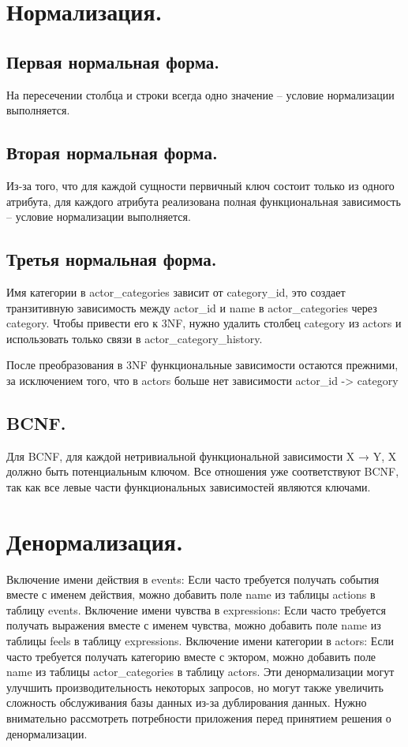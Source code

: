 \section{Нормализация.}
\subsection{Первая нормальная форма.}
На пересечении столбца и строки всегда одно значение – условие нормализации выполняется.
\subsection{Вторая нормальная форма.}
Из-за того, что для каждой сущности первичный ключ состоит только из одного атрибута, для каждого атрибута реализована
полная функциональная зависимость – условие нормализации выполняется.
\subsection{Третья нормальная форма.}
Имя категории в actor\_categories зависит от category\_id, это создает транзитивную зависимость между actor\_id и name
в actor\_categories через category. Чтобы привести его к 3NF, нужно удалить столбец category из actors и использовать
только связи в actor\_category\_history.

После преобразования в 3NF функциональные зависимости остаются прежними, за исключением того, что в actors больше нет зависимости
actor\_id -> category

\subsection{BCNF.}
Для BCNF, для каждой нетривиальной функциональной зависимости X → Y, X должно быть потенциальным ключом. Все отношения
уже соответствуют BCNF, так как все левые части функциональных зависимостей являются ключами.

\section{Денормализация.}
Включение имени действия в events: Если часто требуется получать события вместе с именем действия, можно добавить поле name из таблицы actions в таблицу events.
Включение имени чувства в expressions: Если часто требуется получать выражения вместе с именем чувства, можно добавить поле name из таблицы feels в таблицу expressions.
Включение имени категории в actors: Если часто требуется получать категорию вместе с эктором, можно добавить поле name из таблицы actor\_categories в таблицу actors.
Эти денормализации могут улучшить производительность некоторых запросов, но могут также увеличить сложность обслуживания базы данных из-за дублирования данных.
Нужно внимательно рассмотреть потребности приложения перед принятием решения о денормализации.

